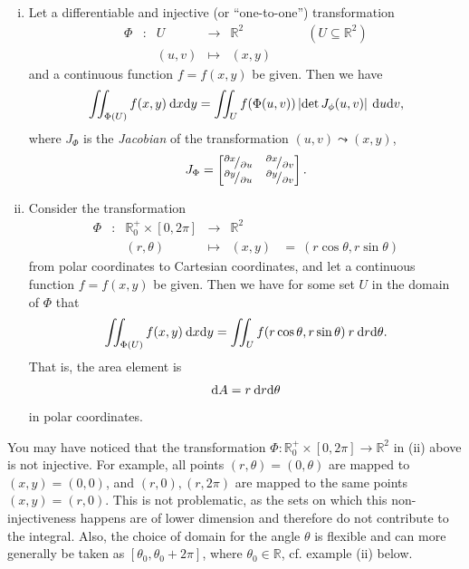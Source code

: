 \begin{theorem}
\label{thm:higher_dim_subst}
\begin{enumerate}[(i)]
	\item Let a differentiable and injective (or ``one-to-one'') transformation
	\begin{equation*}
	\begin{array}{cccccc}
	\Phi & : & U & \rightarrow & \mathbb{R}^2 & \qquad(U\subseteq\mathbb{R}^2) \\
	     &   & (u,v) & \mapsto & (x,y) &
	\end{array}
	\end{equation*}
	and a continuous function $f=f(x,y)$ be given. Then we have 
	\[ \iint_{\Phi(U)} f(x,y) \: \mathrm{d} x \mathrm{d} y =
		\iint_U f(\Phi(u,v)) \left| \det J_{\phi}(u,v) \right| \: \mathrm{d} u \mathrm{d} v, \]
	where $J_{\Phi}$ is the \emph{Jacobian} of the transformation $(u,v)\leadsto(x,y)$,
	\[ J_{\Phi} = \begin{bmatrix}
	{}^{\partial x}\!/_{\partial u} & {}^{\partial x}\!/_{\partial v} \\
	{}^{\partial y}\!/_{\partial u} & {}^{\partial y}\!/_{\partial v} 
	\end{bmatrix}. \]
	\item Consider the transformation
	\begin{equation*}
	\begin{array}{cccccc}
	\Phi & : & \mathbb{R}^+_0\times[0,2\pi] & \rightarrow & \mathbb{R}^2 & \\
	&   & (r,\theta) & \mapsto & (x,y) & = \: (r\cos\theta,r\sin\theta)
	\end{array}
	\end{equation*}
	from polar coordinates to Cartesian coordinates, and let a continuous function $f=f(x,y)$ be given. Then we have for some set $U$ in the domain of $\Phi$ that
	\[ \iint_{\Phi(U)} f(x,y) \: \mathrm{d} x \mathrm{d} y =
	\iint_U f(r\cos\theta,r\sin\theta) \: r \: \mathrm{d} r \mathrm{d} \theta. \]
	That is, the area element is
	\[ \mathrm{d} A = r \: \mathrm{d} r \mathrm{d} \theta \]
	in polar coordinates.
\end{enumerate}
\end{theorem}

\begin{remark}
You may have noticed that the transformation $\Phi:\mathbb{R}^+_0\times[0,2\pi]\rightarrow\mathbb{R}^2$
in (ii) above is not injective. For example, all points $(r,\theta)=(0,\theta)$ are mapped to $(x,y)=(0,0)$, and $(r,0),(r,2\pi)$ are mapped to the same points $(x,y)=(r,0)$. This is not problematic, as the sets on which this non-injectiveness happens are of lower dimension and therefore do not contribute to the integral. Also, the choice of domain for the angle $\theta$ is flexible and can more generally be taken as $[\theta_0,\theta_0+2\pi]$, where $\theta_0\in\mathbb{R}$, cf. example (ii) below.
\end{remark}

